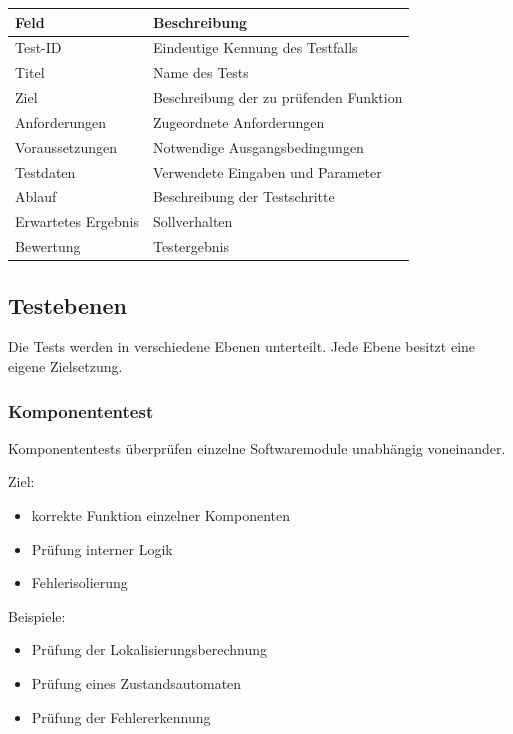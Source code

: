 \begin{longtable}[]{@{}ll@{}}
\toprule\noalign{}
Feld & Beschreibung \\
\midrule\noalign{}
\endhead
\bottomrule\noalign{}
\endlastfoot
Test-ID & Eindeutige Kennung des Testfalls \\
Titel & Name des Tests \\
Ziel & Beschreibung der zu prüfenden Funktion \\
Anforderungen & Zugeordnete Anforderungen \\
Voraussetzungen & Notwendige Ausgangsbedingungen \\
Testdaten & Verwendete Eingaben und Parameter \\
Ablauf & Beschreibung der Testschritte \\
Erwartetes Ergebnis & Sollverhalten \\
Bewertung & Testergebnis \\
\end{longtable}

\subsection{Testebenen}\label{testebenen}

Die Tests werden in verschiedene Ebenen unterteilt. Jede Ebene besitzt
eine eigene Zielsetzung.

\subsubsection{Komponententest}\label{komponententest}

Komponententests überprüfen einzelne Softwaremodule unabhängig
voneinander.

Ziel:

\begin{itemize}
\tightlist
\item
  korrekte Funktion einzelner Komponenten
\item
  Prüfung interner Logik
\item
  Fehlerisolierung
\end{itemize}

Beispiele:

\begin{itemize}
\tightlist
\item
  Prüfung der Lokalisierungsberechnung
\item
  Prüfung eines Zustandsautomaten
\item
  Prüfung der Fehlererkennung
\end{itemize}

